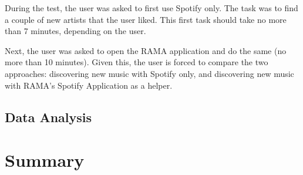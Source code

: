     During the test, the user was asked to first use Spotify only.
    The task was to find a couple of new artists that the user liked.
    This first task should take no more than 7 minutes, depending on the user.

    Next, the user was asked to open the RAMA application and do the same (no more than 10 minutes).
    Given this, the user is forced to compare the two approaches: discovering new music with Spotify only, and discovering new music with RAMA's Spotify Application as a helper.



  

  \subsection{Data Analysis} %
  \label{sub:data_analysis}


  


\section{Summary} %


